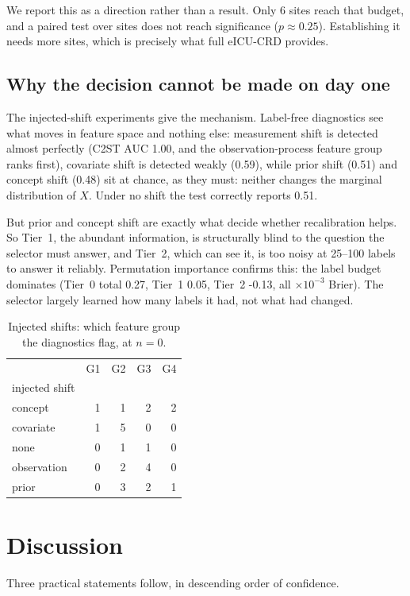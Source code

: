 \documentclass[10pt,twocolumn]{article}
\begin{document}
We report this as a direction rather than a result. Only 6 sites
reach that budget, and a paired test over sites does not reach significance
($p \approx 0.25$). Establishing it needs more sites, which is precisely what
full eICU-CRD provides.

\subsection{Why the decision cannot be made on day one}
The injected-shift experiments give the mechanism. Label-free diagnostics see
what moves in feature space and nothing else: measurement shift is detected
almost perfectly (C2ST AUC
1.00, and the observation-process
feature group ranks first), covariate shift is detected weakly
(0.59), while prior shift
(0.51) and concept shift
(0.48) sit at chance, as they must:
neither changes the marginal distribution of $X$. Under no shift the test
correctly reports 0.51.

But prior and concept shift are exactly what decide whether recalibration
helps. So Tier~1, the abundant information, is structurally blind to the
question the selector must answer, and Tier~2, which can see it, is too noisy
at 25--100 labels to answer it reliably. Permutation importance confirms this:
the label budget dominates (Tier~0 total 0.27,
Tier~1 0.05, Tier~2
-0.13, all $\times 10^{-3}$ Brier). The selector
largely learned how many labels it had, not what had changed.

\begin{table}[t]\centering\small
\caption{Injected shifts: which feature group the diagnostics flag, at $n=0$.}
\label{tab:h7}
\begin{tabular}{lrrrr}
\toprule
 & G1 & G2 & G3 & G4 \\
injected shift &  &  &  &  \\
\midrule
concept & 1 & 1 & 2 & 2 \\
covariate & 1 & 5 & 0 & 0 \\
none & 0 & 1 & 1 & 0 \\
observation & 0 & 2 & 4 & 0 \\
prior & 0 & 3 & 2 & 1 \\
\bottomrule
\end{tabular}

\end{table}

\section{Discussion}
Three practical statements follow, in descending order of confidence.
\end{document}
